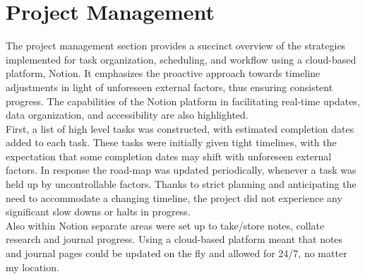 \documentclass{UoNMCHA}
\numberwithin{equation}{section}
\begin{document}
\section{Project Management}\label{sec:Project Mangement}
The project management section provides a succinct overview of the strategies implemented for task organization, scheduling, and workflow using a cloud-based platform, Notion. It emphasizes the proactive approach towards timeline adjustments in light of unforeseen external factors, thus ensuring consistent progress. The capabilities of the Notion platform in facilitating real-time updates, data organization, and accessibility are also highlighted.\\
First, a list of high level tasks was constructed, with estimated completion dates added to each task. These tasks were initially given tight timelines, with the expectation that some completion dates may shift with unforeseen external factors. In response the road-map was updated periodically, whenever a task was held up by uncontrollable factors. Thanks to strict planning and anticipating the need to accommodate a changing timeline, the project did not experience any significant slow downs or halts in progress.\\
Also within Notion separate areas were set up to take/store notes, collate research and journal progress. Using a cloud-based platform meant that notes and journal pages could be updated on the fly and allowed for 24/7, no matter my location.\\
\newpage
\end{document}
